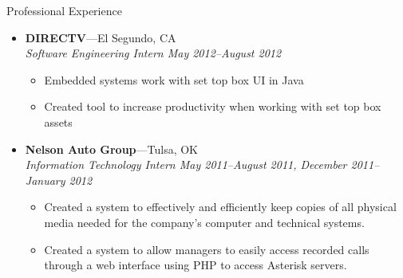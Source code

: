 \documentclass[10pt,oneside]{article}
\newenvironment{ressection}[1]{
	\vspace{4pt}
	{\fontfamily{phv}\selectfont\Large#1}
	\begin{itemize}
	\vspace{3pt}
}{
	\end{itemize}
}
\newcommand{\ressubitem}[1]{
	\vspace{-1pt}
	\item \begin{flushleft} #1 \end{flushleft}
}
\newcommand{\resbigitem}[3]{
	\vspace{-5pt}
	\item
	\textbf{#1}---#2 \\
	\textit{#3}
}
\newenvironment{ressubsec}[3]{
	\resbigitem{#1}{#2}{#3}
	\vspace{-2pt}
	\begin{itemize}
}{
	\end{itemize}
}
\begin{document}
\begin{ressection}{Professional Experience}
	\begin{ressubsec}{DIRECTV}{El Segundo, CA}{Software Engineering Intern May 2012--August 2012}
		\ressubitem{Embedded systems work with set top box UI in Java}
		\ressubitem{Created tool to increase productivity when working with set top box assets}
	\end{ressubsec}
	\begin{ressubsec}{Nelson Auto Group}{Tulsa, OK}{Information Technology Intern May 2011--August 2011, December 2011--January 2012}
		\ressubitem{Created a system to effectively and efficiently keep copies of all physical media needed for the company's computer and technical systems.}
		\ressubitem{Created a system to allow managers to easily access recorded calls through a web interface using PHP to access Asterisk servers.}
	\end{ressubsec}

	
	\begin{comment}
	\begin{ressubsec}{Tulsa Day Center For the Homeless}{Tulsa, OK}{Volunteer:  July 2006--September 2009}
		\ressubitem{Worked mainly with individuals receiving tuberculosis tests.}
		\ressubitem{Entered tuberculosis data and kept computerized records between the Day Center for the Homeless and the Tulsa City-County Health Department up to date.}
	\end{ressubsec}
	\end{comment}

\end{ressection}
\end{document}
